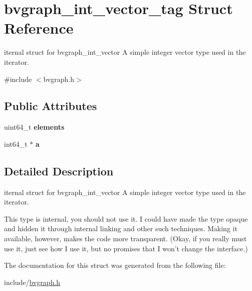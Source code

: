 \hypertarget{structbvgraph__int__vector__tag}{\section{bvgraph\+\_\+int\+\_\+vector\+\_\+tag Struct Reference}
\label{structbvgraph__int__vector__tag}
}


iternal struct for bvgraph\+\_\+int\+\_\+vector A simple integer vector type used in the iterator.  




{\ttfamily \#include $<$bvgraph.\+h$>$}

\subsection*{Public Attributes}
\begin{DoxyCompactItemize}
\item 
\hypertarget{structbvgraph__int__vector__tag_a1b6b9a1ada2252c85deec6fdf7b7366b}{uint64\+\_\+t {\bfseries elements}}\label{structbvgraph__int__vector__tag_a1b6b9a1ada2252c85deec6fdf7b7366b}

\item 
\hypertarget{structbvgraph__int__vector__tag_a0f1e6cf6d53b3d4d54a41e2498fa18ed}{int64\+\_\+t $\ast$ {\bfseries a}}\label{structbvgraph__int__vector__tag_a0f1e6cf6d53b3d4d54a41e2498fa18ed}

\end{DoxyCompactItemize}


\subsection{Detailed Description}
iternal struct for bvgraph\+\_\+int\+\_\+vector A simple integer vector type used in the iterator. 

This type is internal, you should not use it. I could have made the type opaque and hidden it through internal linking and other such techniques. Making it available, however, makes the code more transparent. (Okay, if you really must use it, just see how I use it, but no promises that I won't change the interface.) 

The documentation for this struct was generated from the following file\+:\begin{DoxyCompactItemize}
\item 
include/\hyperlink{bvgraph_8h}{bvgraph.\+h}\end{DoxyCompactItemize}
